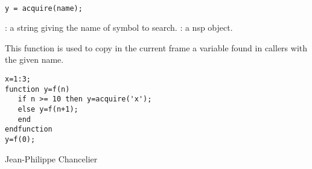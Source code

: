 
\begin{mandesc}
   \\
\end{mandesc}

\begin{calling_sequence}
\begin{verbatim}
y = acquire(name);
\end{verbatim}
\end{calling_sequence}
\begin{parameters}
  \begin{varlist}
    : a string giving the name of symbol to search.
    : a nsp object.
  \end{varlist}
\end{parameters}

\begin{mandescription}
  This function is used to copy in the current frame a variable found in callers 
  with the given name. 
\end{mandescription}

\begin{examples}
\begin{Verbatim}
x=1:3;
function y=f(n)
   if n >= 10 then y=acquire('x'); 
   else y=f(n+1);
   end 
endfunction 
y=f(0);
\end{Verbatim}
\end{examples}

\begin{manseealso}
\end{manseealso}

\begin{authors}
  Jean-Philippe Chancelier
\end{authors}
